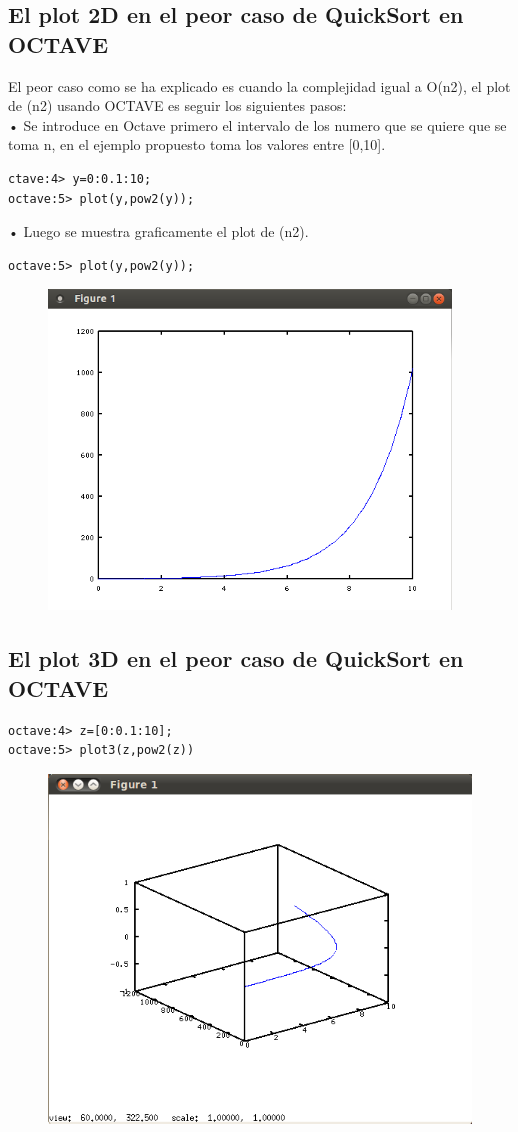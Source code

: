 \documentclass[a4,12pt]{article}
\begin{document}
\subsection{El plot 2D en el peor caso de QuickSort en OCTAVE}
El peor caso como se ha explicado es cuando la complejidad igual a O(n2), el plot de (n2) usando OCTAVE es seguir los siguientes pasos:\\
• Se introduce en Octave primero el intervalo de los numero que se quiere que se toma n, en el ejemplo propuesto toma los valores entre [0,10].\\
\begin{verbatim}
ctave:4> y=0:0.1:10;
octave:5> plot(y,pow2(y));
\end{verbatim}

• Luego se muestra graficamente el plot de (n2).\\
\begin{verbatim}
octave:5> plot(y,pow2(y));
\end{verbatim}
\begin{figure}[H]
  \centering
    \includegraphics{imagenes/plot2}
\end{figure}

\subsection{El plot 3D en el peor caso de QuickSort en OCTAVE}
\begin{verbatim}
octave:4> z=[0:0.1:10];
octave:5> plot3(z,pow2(z))
\end{verbatim}
\begin{figure}[H]
  \centering
    \includegraphics{imagenes/plot3}
\end{figure}
\end{document}
